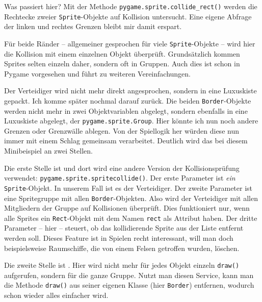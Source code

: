 Was passiert hier? Mit der Methode \texttt{pygame.sprite.collide\_rect()} werden die Rechtecke zweier \texttt{Sprite}-Objekte auf Kollision untersucht. Eine eigene Abfrage der linken und rechtes Grenzen bleibt mir damit erspart.

Für beide Ränder -- allgemeiner gesprochen für viele \texttt{Sprite}-Objekte -- wird hier die Kollision mit einem einzelnen Objekt überprüft. Grundsätzlich kommen Sprites selten einzeln daher, sondern oft in Gruppen. Auch dies ist schon in Pygame vorgesehen und führt zu weiteren Vereinfachungen.


Der Verteidiger wird nicht mehr direkt angesprochen, sondern in eine Luxuskiste gepackt. Ich komme später nochmal darauf zurück. Die beiden \texttt{Border}-Objekte werden nicht mehr in zwei Objektvariablen abgelegt, sondern ebenfalls in eine Luxuskiste abgelegt, der \texttt{pygame.sprite.Group}. Hier könnte ich nun noch andere Grenzen oder Grenzwälle ablegen. Von der Spiellogik her würden diese nun immer mit einem Schlag gemeinsam verarbeitet. Deutlich wird das bei diesem Minibeispiel an zwei Stellen.

Die erste Stelle ist  und dort wird eine andere Version der Kollisionsprüfung verwendet: \texttt{pygame.sprite.\-sprite\-collide()}. Der erste Parameter ist \emph{ein} \texttt{Sprite}-Objekt. In unserem Fall ist es der Verteidiger. Der zweite Parameter ist eine Spritegruppe mit allen \texttt{Border}-Objekten. Also wird der Verteidiger mit allen Mitgliedern der Gruppe auf Kollisionen überprüft. Dies funktioniert nur, wenn alle Sprites ein \texttt{Rect}-Objekt mit dem Namen \texttt{rect} als Attribut haben. Der dritte Parameter -- hier \false -- steuert, ob das kollidierende Sprite aus der Liste entfernt werden soll. Dieses Feature ist in Spielen recht interessant, will man doch beispielsweise Raumschiffe, die von einem Felsen getroffen wurden, löschen.

Die zweite Stelle ist . Hier wird nicht mehr für jedes Objekt einzeln \texttt{draw()} aufgerufen, sondern für die ganze Gruppe. Nutzt man diesen Service, kann man die Methode \texttt{draw()} aus seiner eigenen Klasse (hier \texttt{Border}) entfernen, wodurch schon wieder alles einfacher wird.

